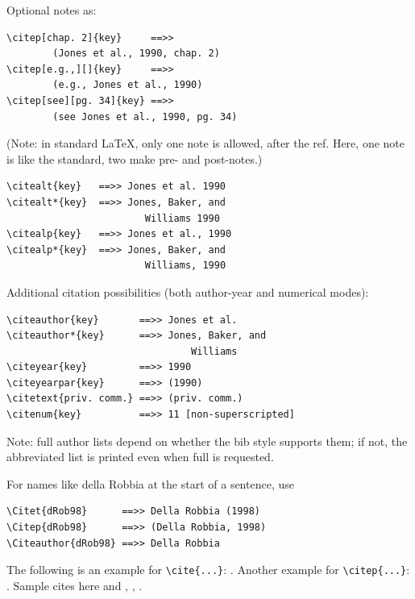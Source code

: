 \documentclass[unnumsec,webpdf,modern,large]{mam-authoring-template}%
\theoremstyle{thmstyleone}%
\theoremstyle{thmstyletwo}%
\theoremstyle{thmstylethree}%
\begin{document}
\noindent
Optional notes as:


{%
\begin{verbatim}
\citep[chap. 2]{key}     ==>>
        (Jones et al., 1990, chap. 2)
\citep[e.g.,][]{key}     ==>>
        (e.g., Jones et al., 1990)
\citep[see][pg. 34]{key} ==>>
        (see Jones et al., 1990, pg. 34)
\end{verbatim}}


\noindent
(Note: in standard LaTeX, only one note is allowed, after the ref.
Here, one note is like the standard, two make pre- and post-notes.)


{%
\begin{verbatim}
\citealt{key}   ==>> Jones et al. 1990
\citealt*{key}  ==>> Jones, Baker, and
                        Williams 1990
\citealp{key}   ==>> Jones et al., 1990
\citealp*{key}  ==>> Jones, Baker, and
                        Williams, 1990
\end{verbatim}}


\noindent
Additional citation possibilities (both author-year and numerical modes):


{%
\begin{verbatim}
\citeauthor{key}       ==>> Jones et al.
\citeauthor*{key}      ==>> Jones, Baker, and
                                Williams
\citeyear{key}         ==>> 1990
\citeyearpar{key}      ==>> (1990)
\citetext{priv. comm.} ==>> (priv. comm.)
\citenum{key}          ==>> 11 [non-superscripted]
\end{verbatim}}


\noindent
Note: full author lists depend on whether the bib style supports them;
if not, the abbreviated list is printed even when full is requested.

\noindent
For names like della Robbia at the start of a sentence, use


{%
\begin{verbatim}
\Citet{dRob98}      ==>> Della Robbia (1998)
\Citep{dRob98}      ==>> (Della Robbia, 1998)
\Citeauthor{dRob98} ==>> Della Robbia
\end{verbatim}}


\noindent
The following is an example for \verb+\cite{...}+: \cite{rahman2019centroidb}. Another example for \verb+\citep{...}+: \citep{bahdanau2014neural,imboden2018cardiorespiratory,motiian2017unified,murphy2012machine,ji20123d}.
Sample cites here \cite{krizhevsky2012imagenet,horvath2018dna} and \cite{pyrkov2018quantitative}, \cite{wang2018face}, \cite{lecun2015deep,zhang2018fine,ravi2016deep}.
\end{document}
